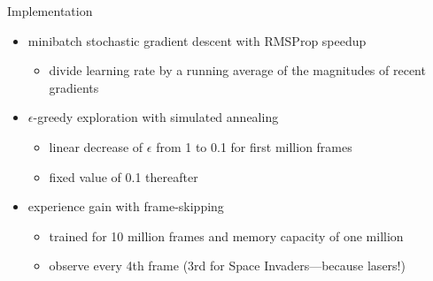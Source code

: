 \begin{frame}{Implementation}
    \begin{itemize}\itemsep=12pt

        \item minibatch stochastic gradient descent with RMSProp speedup
        \vspace*{0.5em}
        \begin{itemize}
            \item divide learning rate by a running average of the magnitudes of recent gradients
        \end{itemize}

        \item $\epsilon$-greedy exploration with simulated annealing 
        \vspace*{0.5em}
        \begin{itemize}
            \item linear decrease of $\epsilon$ from 1 to 0.1 for first million frames
            \item fixed value of 0.1 thereafter
        \end{itemize}

        \item experience gain with frame-skipping
        \vspace*{0.5em}
        \begin{itemize}
            \item trained for 10 million frames and memory capacity of one million
            \item observe every 4th frame (3rd for Space Invaders---because lasers!)
        \end{itemize}

    \end{itemize}
\end{frame}

